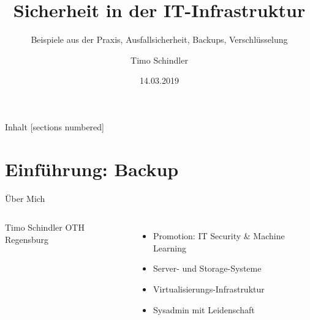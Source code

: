\documentclass[10pt]{beamer}
\title{Sicherheit in der IT-Infrastruktur}
\subtitle{Beispiele aus der Praxis, Ausfallsicherheit, Backups, Verschlüsselung}
\date{14.03.2019}
\author{Timo Schindler}
\institute{OTH Regensburg}
\begin{document}
\maketitle

%
%
\begin{frame}{Inhalt}
  [sections numbered]
  \tableofcontents[hideallsubsections]
\end{frame}

\section{Einführung: Backup}

%
%
\begin{frame}[fragile]{Über Mich}

\begin{columns}[T,c,onlytextwidth]
\begin{exampleblock}{Timo Schindler}
OTH Regensburg
\end{exampleblock}

\begin{itemize}
  	\item Promotion: IT Security \& Machine Learning
  	\item Server- und Storage-Systeme
  	\item Virtualisierungs-Infrastruktur
  	\item Sysadmin mit Leidenschaft
\end{itemize}
\end{columns}
\end{frame}
\end{document}

